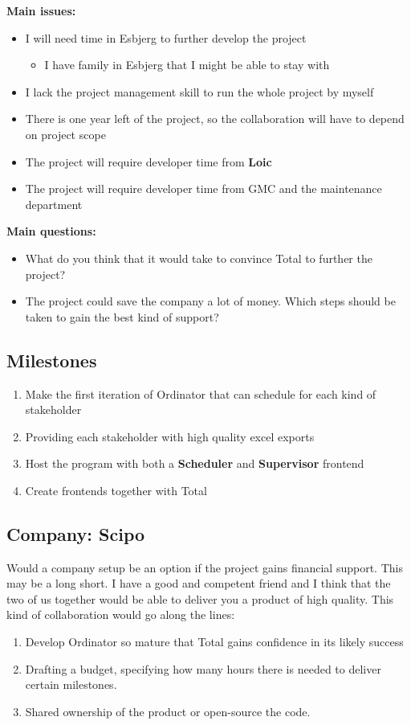 \documentclass{article}
\begin{document}
\textbf{Main issues:}
\begin{itemize}
    \item I will need time in Esbjerg to further develop the project
    \begin{itemize}
        \item I have family in Esbjerg that I might be able to stay with
    \end{itemize}
    \item I lack the project management skill to run the whole project by myself
    \item There is one year left of the project, so the collaboration will have to depend on project scope
    \item The project will require developer time from \textbf{Loic}
    \item The project will require developer time from GMC and the maintenance department
\end{itemize}

\textbf{Main questions:}
\begin{itemize}
    \item What do you think that it would take to convince Total to further the project? 
    \item The project could save the company a lot of money. Which steps should be
          taken to gain the best kind of support?
\end{itemize}

\subsection{Milestones}
\begin{enumerate}
    \item Make the first iteration of Ordinator that can schedule for each kind of stakeholder
    \item Providing each stakeholder with high quality excel exports 
    \item Host the program with both a \textbf{Scheduler} and \textbf{Supervisor} frontend
    \item Create frontends together with Total
\end{enumerate}

\subsection{Company: Scipo}
Would a company setup be an option if the project gains financial support. This may be a
long short. I have a good and competent friend and I think that the two of us together
would be able to deliver you a product of high quality. This kind of collaboration would
go along the lines:
\begin{enumerate}
    \item Develop Ordinator so mature that Total gains confidence in its likely success
    \item Drafting a budget, specifying how many hours there is needed to deliver certain milestones.
    \item Shared ownership of the product or open-source the code.
\end{enumerate}
\end{document}
